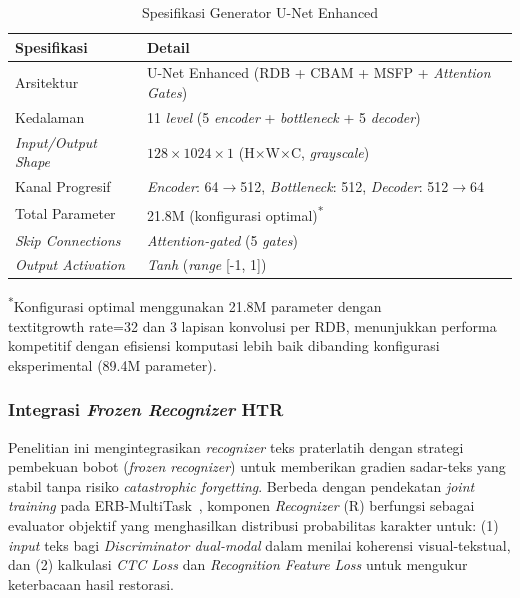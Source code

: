\documentclass[12pt,a4paper]{book}
\begin{document}
\begin{table}[H]
\centering
\caption{Spesifikasi Generator U-Net Enhanced}
\label{tab:generator-stats}
\small
\begin{tabular}{|l|l|}
\hline
\textbf{Spesifikasi} & \textbf{Detail} \\
\hline
Arsitektur & U-Net Enhanced (RDB + CBAM + MSFP + \textit{Attention Gates}) \\
\hline
Kedalaman & 11 \textit{level} (5 \textit{encoder} + \textit{bottleneck} + 5 \textit{decoder}) \\
\hline
\textit{Input/Output Shape} & $128 \times 1024 \times 1$ (H$\times$W$\times$C, \textit{grayscale}) \\
\hline
Kanal Progresif & \textit{Encoder}: 64$\rightarrow$512, \textit{Bottleneck}: 512, \textit{Decoder}: 512$\rightarrow$64 \\
\hline
Total Parameter & 21.8M (konfigurasi optimal)\textsuperscript{*} \\
\hline
\textit{Skip Connections} & \textit{Attention-gated} (5 \textit{gates}) \\
\hline
\textit{Output Activation} & \textit{Tanh} (\textit{range} [-1, 1]) \\
\hline
\end{tabular}
\end{table}

\noindent\textsuperscript{*}Konfigurasi optimal menggunakan 21.8M parameter dengan \\textit{growth rate}=32 dan 3 lapisan konvolusi per RDB, menunjukkan performa kompetitif dengan efisiensi komputasi lebih baik dibanding konfigurasi eksperimental (89.4M parameter).

\subsubsection{Integrasi \textit{Frozen Recognizer} HTR} %

Penelitian ini mengintegrasikan \textit{recognizer} teks praterlatih dengan strategi pembekuan bobot (\textit{frozen recognizer}) untuk memberikan gradien sadar-teks yang stabil tanpa risiko \textit{catastrophic forgetting}. Berbeda dengan pendekatan \textit{joint training} pada ERB-MultiTask~\cite{erb2021}, komponen \textit{Recognizer} (R) berfungsi sebagai evaluator objektif yang menghasilkan distribusi probabilitas karakter untuk: (1) \textit{input} teks bagi \textit{Discriminator dual-modal} dalam menilai koherensi visual-tekstual, dan (2) kalkulasi \textit{CTC Loss} dan \textit{Recognition Feature Loss} untuk mengukur keterbacaan hasil restorasi.
\end{document}

